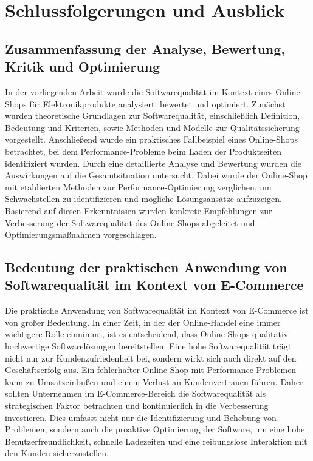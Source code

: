 \section{Schlussfolgerungen und Ausblick}
\subsection{Zusammenfassung der Analyse, Bewertung, Kritik und Optimierung}
In der vorliegenden Arbeit wurde die Softwarequalität im Kontext eines Online-Shops für Elektronikprodukte analysiert, bewertet und optimiert. Zunächst wurden theoretische Grundlagen zur Softwarequalität, einschließlich Definition, Bedeutung und Kriterien, sowie Methoden und Modelle zur Qualitätssicherung vorgestellt. Anschließend wurde ein praktisches Fallbeispiel eines Online-Shops betrachtet, bei dem Performance-Probleme beim Laden der Produktseiten identifiziert wurden. Durch eine detaillierte Analyse und Bewertung wurden die Auswirkungen auf die Gesamtsituation untersucht. Dabei wurde der Online-Shop mit etablierten Methoden zur Performance-Optimierung verglichen, um Schwachstellen zu identifizieren und mögliche Lösungsansätze aufzuzeigen. Basierend auf diesen Erkenntnissen wurden konkrete Empfehlungen zur Verbesserung der Softwarequalität des Online-Shops abgeleitet und Optimierungsmaßnahmen vorgeschlagen.

\subsection{Bedeutung der praktischen Anwendung von Softwarequalität im Kontext von E-Commerce}
Die praktische Anwendung von Softwarequalität im Kontext von E-Commerce ist von großer Bedeutung. In einer Zeit, in der der Online-Handel eine immer wichtigere Rolle einnimmt, ist es entscheidend, dass Online-Shops qualitativ hochwertige Softwarelösungen bereitstellen. Eine hohe Softwarequalität trägt nicht nur zur Kundenzufriedenheit bei, sondern wirkt sich auch direkt auf den Geschäftserfolg aus. Ein fehlerhafter Online-Shop mit Performance-Problemen kann zu Umsatzeinbußen und einem Verlust an Kundenvertrauen führen. Daher sollten Unternehmen im E-Commerce-Bereich die Softwarequalität als strategischen Faktor betrachten und kontinuierlich in die Verbesserung investieren. Dies umfasst nicht nur die Identifizierung und Behebung von Problemen, sondern auch die proaktive Optimierung der Software, um eine hohe Benutzerfreundlichkeit, schnelle Ladezeiten und eine reibungslose Interaktion mit den Kunden sicherzustellen.

